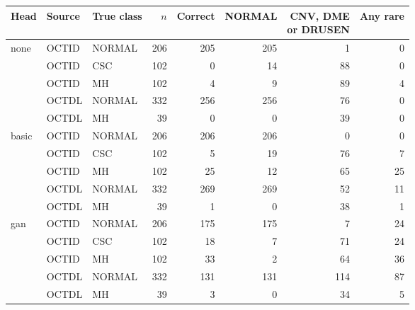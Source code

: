 \begin{tabular}{@{}lllrrrrr@{}}
\toprule
Head & Source & True class & $n$ & Correct & NORMAL & \makecell{CNV, DME\\or DRUSEN} & Any rare \\
\midrule
none & OCTID & NORMAL & 206 & 205 & 205 & 1 & 0 \\
 & OCTID & CSC & 102 & 0 & 14 & 88 & 0 \\
 & OCTID & MH & 102 & 4 & 9 & 89 & 4 \\
 & OCTDL & NORMAL & 332 & 256 & 256 & 76 & 0 \\
 & OCTDL & MH & 39 & 0 & 0 & 39 & 0 \\
\addlinespace[2pt]
basic & OCTID & NORMAL & 206 & 206 & 206 & 0 & 0 \\
 & OCTID & CSC & 102 & 5 & 19 & 76 & 7 \\
 & OCTID & MH & 102 & 25 & 12 & 65 & 25 \\
 & OCTDL & NORMAL & 332 & 269 & 269 & 52 & 11 \\
 & OCTDL & MH & 39 & 1 & 0 & 38 & 1 \\
\addlinespace[2pt]
gan & OCTID & NORMAL & 206 & 175 & 175 & 7 & 24 \\
 & OCTID & CSC & 102 & 18 & 7 & 71 & 24 \\
 & OCTID & MH & 102 & 33 & 2 & 64 & 36 \\
 & OCTDL & NORMAL & 332 & 131 & 131 & 114 & 87 \\
 & OCTDL & MH & 39 & 3 & 0 & 34 & 5 \\
\bottomrule
\end{tabular}
